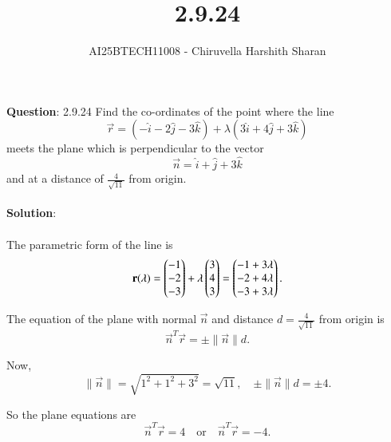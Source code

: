 \documentclass[journal]{IEEEtran}
\begin{document}

\vspace{3cm}

\title{2.9.24}
\author{AI25BTECH11008 - Chiruvella Harshith Sharan}
{\let\newpage\relax\maketitle}

\renewcommand{\theequation}{\arabic{equation}}
\renewcommand{\thefigure}{\arabic{figure}}
\renewcommand{\thetable}{\arabic{table}}

\setlength{\intextsep}{10pt} 

\textbf{Question}: 2.9.24 Find the co-ordinates of the point where the line
\[
\vec{r} = (-\hat{i}-2\hat{j}-3\hat{k}) + \lambda(3\hat{i}+4\hat{j}+3\hat{k})
\]
meets the plane which is perpendicular to the vector
\[
\vec{n} = \hat{i} + \hat{j} + 3\hat{k}
\]
and at a distance of $\frac{4}{\sqrt{11}}$ from origin.\\\\


\textbf{Solution}: \\\\[0.3cm]

The parametric form of the line is
\begin{equation}
\mathbf{r}(\lambda) = \begin{pmatrix}-1 \\ -2 \\ -3\end{pmatrix} + \lambda\begin{pmatrix}3 \\ 4 \\ 3\end{pmatrix}
= \begin{pmatrix}-1+3\lambda \\ -2+4\lambda \\ -3+3\lambda\end{pmatrix}.
\end{equation}

The equation of the plane with normal $\vec{n}$ and distance $d=\tfrac{4}{\sqrt{11}}$ from origin is
\begin{equation}
\vec{n}^T\vec{r} = \pm \|\vec{n}\| d.
\end{equation}

Now,
\begin{equation}
\|\vec{n}\| = \sqrt{1^2 + 1^2 + 3^2} = \sqrt{11},
\quad
\pm \|\vec{n}\| d = \pm 4.
\end{equation}

So the plane equations are
\begin{equation}
\vec{n}^T \vec{r} = 4
\quad \text{or} \quad
\vec{n}^T \vec{r} = -4.
\end{equation}
\end{document}
